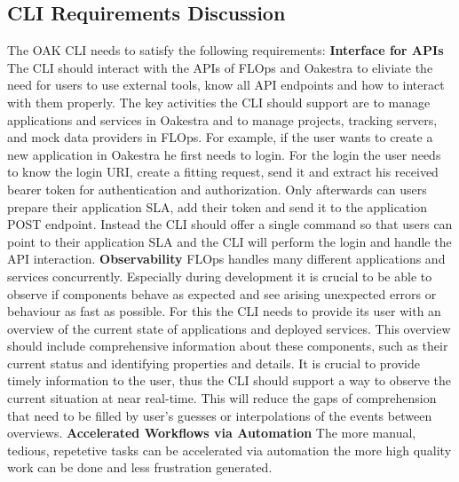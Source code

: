 \subsection{CLI Requirements Discussion}

The OAK CLI needs to satisfy the following requirements:
\vspace{5mm}
\newline
\textbf{Interface for APIs}\newline
The CLI should interact with the APIs of FLOps and Oakestra to eliviate the need for users to use external tools, know all API endpoints and how to interact with them properly.
The key activities the CLI should support are to manage applications and services in Oakestra and to manage projects, tracking servers, and mock data providers in FLOps.
For example, if the user wants to create a new application in Oakestra he first needs to login.
For the login the user needs to know the login URI, create a fitting request, send it and extract his received bearer token for authentication and authorization.
Only afterwards can users prepare their application SLA, add their token and send it to the application POST endpoint.
Instead the CLI should offer a single command so that users can point to their application SLA and the CLI will perform the login and handle the API interaction.
\vspace{5mm}
\newline
\textbf{Observability}\newline
FLOps handles many different applications and services concurrently.
Especially during development it is crucial to be able to observe if components behave as expected and see arising unexpected errors or behaviour as fast as possible.
For this the CLI needs to provide its user with an overview of the current state of applications and deployed services.
This overview should include comprehensive information about these components, such as their current status and identifying properties and details.
It is crucial to provide timely information to the user, thus the CLI should support a way to observe the current situation at near real-time.
This will reduce the gaps of comprehension that need to be filled by user's guesses or interpolations of the events between overviews.
\vspace{5mm}
\newline
\textbf{Accelerated Workflows via Automation}\newline
The more manual, tedious,  repetetive tasks can be accelerated via automation the more high quality work can be done and less frustration generated.
